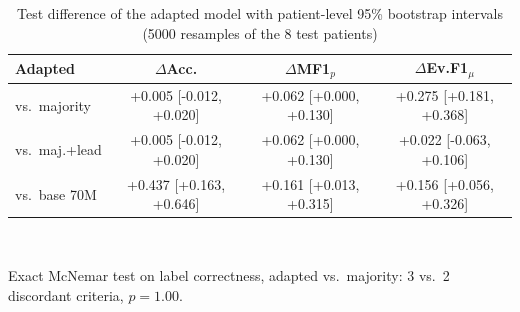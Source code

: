 \begin{table}[t]\centering\caption{Test difference of the adapted model with patient-level 95\% bootstrap intervals (5000 resamples of the 8 test patients)}\label{tab:ci}\footnotesize
\begin{tabular}{lccc}
\hline
Adapted & $\Delta$Acc. & $\Delta$MF1$_p$ & $\Delta$Ev.F1$_\mu$\\\hline
vs.\ majority & +0.005 [-0.012, +0.020] & +0.062 [+0.000, +0.130] & +0.275 [+0.181, +0.368]\\
vs.\ maj.+lead & +0.005 [-0.012, +0.020] & +0.062 [+0.000, +0.130] & +0.022 [-0.063, +0.106]\\
vs.\ base 70M & +0.437 [+0.163, +0.646] & +0.161 [+0.013, +0.315] & +0.156 [+0.056, +0.326]\\
\hline\end{tabular}
\\[2pt]\parbox{0.95\linewidth}{\scriptsize Exact McNemar test on label correctness, adapted vs.\ majority: 3 vs.\ 2 discordant criteria, $p=1.00$.}
\end{table}

